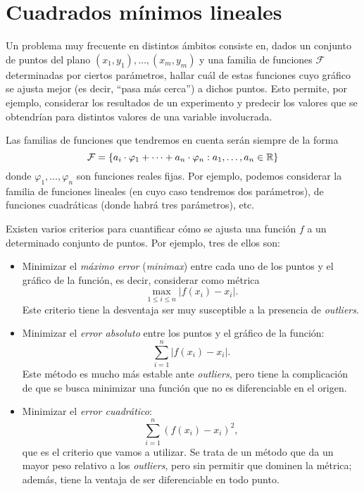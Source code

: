 
\section{Cuadrados mínimos lineales}
\label{section:cml}

Un problema muy frecuente en distintos ámbitos consiste en, dados
un conjunto de puntos del plano $(x_1,y_1), \dots, (x_m,y_m)$ y una familia
de funciones $\mathcal{F}$ determinadas por ciertos parámetros, hallar
cuál de estas funciones cuyo gráfico se ajusta mejor (es decir, ``pasa más
cerca'') a dichos puntos. Esto permite, por ejemplo, considerar los resultados
de un experimento y predecir los valores que se obtendrían para distintos
valores de una variable involucrada.

Las familias de funciones que tendremos en cuenta serán siempre de la forma
\[ \mathcal{F} = \{ a_i \cdot \varphi_1 + \dots + a_n \cdot \varphi_n
    : a_1, \dots, a_n \in \mathbb{R} \} \]
donde $\varphi_1, \dots, \varphi_n$ son funciones reales fijas. Por ejemplo,
podemos considerar la familia de funciones lineales (en cuyo caso tendremos
dos parámetros), de funciones cuadráticas (donde habrá tres parámetros), etc.

Existen varios criterios para cuantificar cómo se ajusta una función $f$ a un
determinado conjunto de puntos. Por ejemplo, tres de ellos son:
\begin{itemize}
\item Minimizar el \emph{máximo error} (\emph{minimax}) entre cada uno de los
    puntos y el gráfico de la función, es decir, considerar como métrica
    \[ \max_{1\leq i \leq n} \left\vert f(x_i) - x_i \right\vert. \]
    Este criterio tiene la desventaja ser muy susceptible a la presencia
    de \emph{outliers}.
\item Minimizar el \emph{error absoluto} entre los puntos y el gráfico de la
    función:
    \[ \sum_{i = 1}^{n} \left\vert f(x_i) - x_i \right\vert. \]
    Este método es mucho más estable ante \emph{outliers}, pero tiene la
    complicación de que se busca minimizar una función que no es
    diferenciable en el origen.
\item Minimizar el \emph{error cuadrático}:
    \[ \sum_{i = 1}^{n} \left( f(x_i) - x_i \right)^2, \]
    que es el criterio que vamos a utilizar. Se trata de un método que da
    un mayor peso relativo a los \emph{outliers}, pero sin permitir que
    dominen la métrica; además, tiene la ventaja de ser diferenciable en todo
    punto.
\end{itemize}

